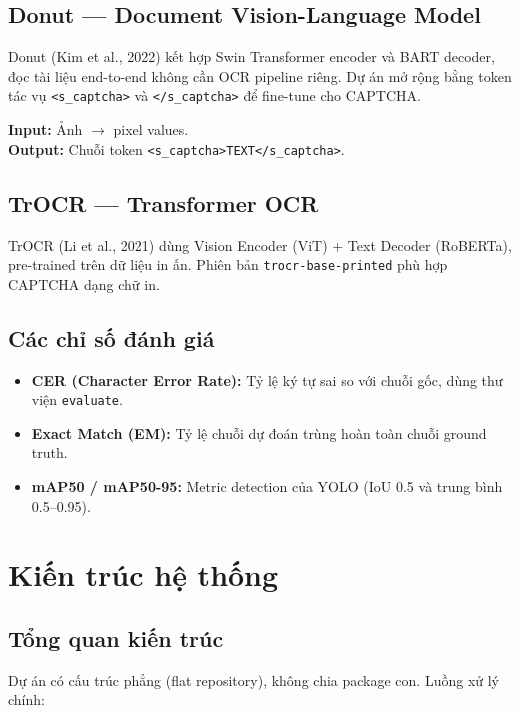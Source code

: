 \documentclass[a4paper,12pt]{report}
\begin{document}
\section{Donut --- Document Vision-Language Model}
Donut (Kim et al., 2022) kết hợp Swin Transformer encoder và BART decoder, đọc tài liệu end-to-end không cần OCR pipeline riêng. Dự án mở rộng bằng token tác vụ \texttt{<s\_captcha>} và \texttt{</s\_captcha>} để fine-tune cho CAPTCHA.

\textbf{Input:} Ảnh $\rightarrow$ pixel values.\\
\textbf{Output:} Chuỗi token \texttt{<s\_captcha>TEXT</s\_captcha>}.

\section{TrOCR --- Transformer OCR}
TrOCR (Li et al., 2021) dùng Vision Encoder (ViT) + Text Decoder (RoBERTa), pre-trained trên dữ liệu in ấn. Phiên bản \texttt{trocr-base-printed} phù hợp CAPTCHA dạng chữ in.

\section{Các chỉ số đánh giá}
\begin{itemize}[leftmargin=*]
  \item \textbf{CER (Character Error Rate):} Tỷ lệ ký tự sai so với chuỗi gốc, dùng thư viện \texttt{evaluate}.
  \item \textbf{Exact Match (EM):} Tỷ lệ chuỗi dự đoán trùng hoàn toàn chuỗi ground truth.
  \item \textbf{mAP50 / mAP50-95:} Metric detection của YOLO (IoU 0.5 và trung bình 0.5--0.95).
\end{itemize}

\chapter{Kiến trúc hệ thống}

\section{Tổng quan kiến trúc}
Dự án có cấu trúc phẳng (flat repository), không chia package con. Luồng xử lý chính:
\end{document}
